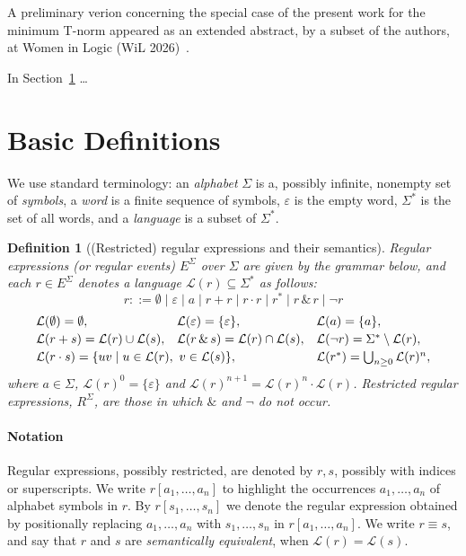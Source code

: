 \documentclass{article}
\newtheorem{definition}{Definition}[section]
\begin{document}
A preliminary verion concerning the special case of the present work for the minimum T-norm appeared as an extended abstract, by a subset of the authors, at Women in Logic (WiL 2026)~\cite{KM26}.\vspace{1cm}

 In Section~\ref{basic} \ldots

\section{Basic Definitions}\label{basic}
We use standard terminology: an \emph{alphabet} $\Sigma$ is a, possibly infinite,  nonempty set of
\emph{symbols}, a \emph{word} is a finite sequence of symbols, $\varepsilon$ is the empty
word, $\Sigma^*$ is the set of all words, and a \emph{language} is a subset of $\Sigma^*$.

\begin{definition}[(Restricted) regular expressions and their semantics]
\label{def:regex}
\emph{Regular expressions} (or \emph{regular events}) $E^\Sigma$ over $\Sigma$ are given by
the grammar below, and each $r\in E^\Sigma$ denotes a language
$\mathcal L(r)\subseteq\Sigma^*$ as follows:
\[
r ::= \emptyset \mid \varepsilon \mid a \mid r+r \mid r\cdot r \mid r^* \mid r \,\&\, r \mid \neg r
\]
\[
\begin{array}{l@{\quad}l@{\quad}l}
\mathcal{L}(\emptyset) = \emptyset, &
\mathcal{L}(\varepsilon) = \{\varepsilon\}, &
\mathcal{L}(a) = \{a\},\\[0.5ex]
\mathcal{L}(r + s) = \mathcal{L}(r) \cup \mathcal{L}(s), &
\mathcal{L}(r \,\&\, s) = \mathcal{L}(r) \cap \mathcal{L}(s), &
\mathcal{L}(\neg r) = \Sigma^* \setminus \mathcal{L}(r),\\[0.5ex]
\multicolumn{2}{l}{\mathcal{L}(r \cdot s) = \{uv \mid u \in \mathcal{L}(r),\ v \in \mathcal{L}(s)\},} &
\mathcal{L}(r^*) = \bigcup_{n \geq 0} \mathcal{L}(r)^n,
\end{array}
\]
where  $a\in\Sigma$, $\mathcal{L}(r)^0 = \{\varepsilon\}$ and
$\mathcal{L}(r)^{n+1} = \mathcal{L}(r)^n \cdot \mathcal{L}(r)$.
\emph{Restricted} regular expressions, $R^\Sigma$, are those in which $\&$ and $\neg$ do
not occur.
\end{definition}

\paragraph{Notation} Regular expressions, possibly restricted, are denoted by $r,s$, possibly with indices or superscripts. We write $r[a_1,\ldots,a_n]$ to highlight the occurrences $a_1,\ldots,a_n$ of alphabet symbols in $r$. By $r[s_1,\ldots,s_n]$ we denote the regular expression obtained by positionally replacing $a_1,\ldots,a_n$ with $s_1,\ldots,s_n$ in $r[a_1,\ldots,a_n]$. We write $r\equiv s$, and say that $r$ and $s$ are \emph{semantically equivalent}, when $\mathcal L(r)=\mathcal L(s)$.\smallskip
\end{document}
